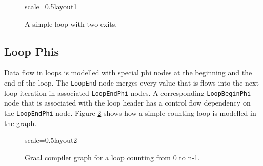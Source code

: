 \documentclass[twocolumn]{svjour3}
\newcommand\nodename[1]{\texttt{#1}}
\begin{document}
\begin{figure}[h]
  \label{fig:loop1}
  \centering
\begin{digraphenv}{scale=0.5}{layout1}
\end{digraphenv}
  \caption{A simple loop with two exits.}
\end{figure}

\subsection{Loop Phis}
Data flow in loops is modelled with special phi nodes at the beginning and the end of the loop.
The \nodename{LoopEnd} node merges every value that is flows into the next loop iteration in associated \nodename{LoopEndPhi} nodes.
A corresponding \nodename{LoopBeginPhi} node that is associated with the loop header has a control flow dependency on the \nodename{LoopEndPhi} node.
Figure \ref{fig:loop2} shows how a simple counting loop is modelled in the graph.

\begin{figure}[h]
  \label{fig:loop2}
  \centering
\begin{digraphenv}{scale=0.5}{layout2}
\end{digraphenv}
  \caption{Graal compiler graph for a loop counting from 0 to n-1.}
\end{figure}
\end{document}
